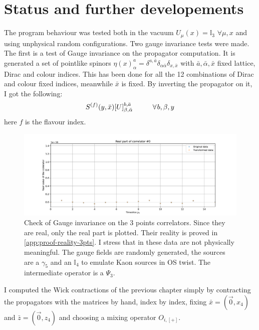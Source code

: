 \documentclass[english, LaM, oneside, noexaminfo]{sapthesis}
\begin{document}
\section{Status and further developements}
\noindent
The program behaviour was tested both in the vacuum $U_\mu (x) = \mathbb{I}_3$ $\forall \mu,x$ and using unphysical random configurations.
Two gauge invariance tests were made.
\newline
The first is a test of Gauge invariance on the propagator computation.
It is generated a set of pointlike spinors $\eta(x)_\alpha^a = \delta^{a,\bar a}\delta_{\alpha \bar \alpha} \delta_{x,\bar x}$ with $\bar a, \bar \alpha, \bar x$ fixed lattice, Dirac and colour indices.
This has been done for all the 12 combinations of Dirac and colour fixed indices, meanwhile $\bar x$ is fixed.
By inverting the propagator on it, I got the following:
\begin{equation*}
    S^{(f)}(y, \bar x)[U]^{b,\bar a}_{\beta, \bar \alpha} \hspace*{1cm} \forall \hspace*{0.3mm} b,\beta,y
\end{equation*}
here $f$ is the flavour index.
\begin{figure}[h!]
    \centering
    \includegraphics[width=\textwidth]{imgs-MSc-thesis/check1.pdf}
    \caption{Check of Gauge invariance on the 3 points correlators. Since they are real, only the real part is plotted.
        Their reality is proved in \ref{app:proof-reality-3pts}.
        I stress that in these data are not physically meaningful.
        The gauge fields are randomly generated, the sources are a $\gamma_5$ and an $\mathbb{I}_4$ to emulate Kaon sources in OS twist.
        The intermediate operator is a $\Psi_3$.}
    \label{fig:check1}
\end{figure}
\newline
I computed the Wick contractions of the previous chapter simply by contracting the propagators with the matrices by hand, index by index, fixing $\bar x=(\vec 0, x_4)$ and  $\bar z=(\vec 0, z_4)$ and choosing a mixing operator $O_{i,[+]}$.
\end{document}
